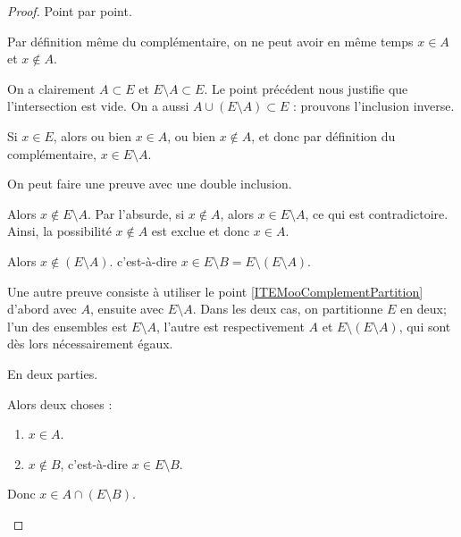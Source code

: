 \begin{proof}
	Point par point.
	\begin{subproof}
		Par définition même du complémentaire, on ne peut avoir en même temps \( x \in A \) et \(x \notin A \).

		On a clairement \( A \subset E \) et \( E \setminus A \subset E \). Le point précédent nous justifie que l'intersection est vide. On a aussi \( A \cup ( E \setminus A) \subset E \) : prouvons l'inclusion inverse.

		Si \( x \in E \), alors ou bien \( x \in A \), ou bien \( x \not\in A\), et donc par définition du complémentaire, \( x \in E \setminus A \).

		On peut faire une preuve avec une double inclusion.
		\begin{subproof}
			Alors  \( x\not\in E\setminus A \). Par l'absurde, si \( x\not\in A\), alors \( x \in E \setminus A \), ce qui est contradictoire. Ainsi, la possibilité \( x\not\in A\) est exclue et donc \( x\in A\).

			\spitem[Si \( x\in A\)]
			Alors \( x\not\in (E\setminus A) \).  c'est-à-dire \( x\in E\setminus B=E\setminus(E\setminus A )\).
		\end{subproof}

		Une autre preuve consiste à utiliser le point \ref{ITEMooComplementPartition} d'abord avec \( A \), ensuite avec \( E \setminus A\). Dans les deux cas, on partitionne \( E \) en deux; l'un des ensembles est \( E \setminus A \), l'autre est respectivement \( A \) et \( E \setminus (E \setminus A) \), qui sont dès lors nécessairement égaux.

		En deux parties.
		\begin{subproof}
			\spitem[Si \( x\in A\setminus B\)]
			Alors deux choses :
			\begin{enumerate}
				\item
				      \( x\in A\).
				\item
				      \( x\not\in B\), c'est-à-dire \( x\in E\setminus B\).
			\end{enumerate}
			Donc \( x\in A\cap(E\setminus B)\).


\end{subproof}
\end{subproof}
\end{proof}
